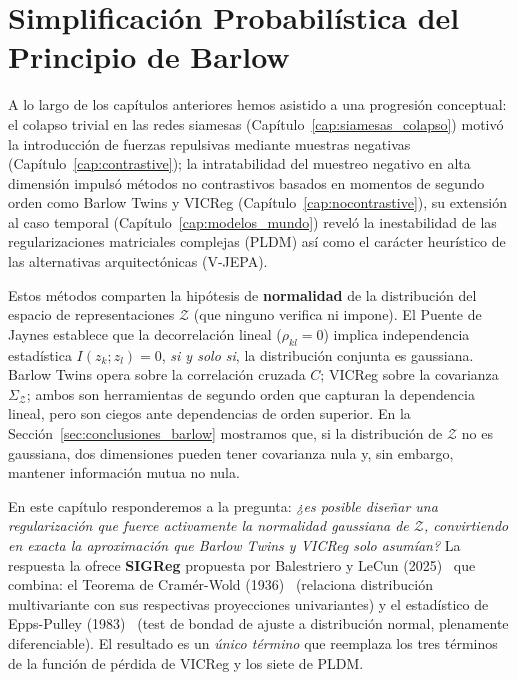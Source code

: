 \chapter{Simplificación Probabilística del Principio de Barlow}
\label{cap:leworldmodel}

A lo largo de los capítulos anteriores hemos asistido a una progresión conceptual: el colapso trivial en las redes siamesas (Capítulo~\ref{cap:siamesas_colapso}) motivó la introducción de fuerzas repulsivas mediante muestras negativas (Capítulo~\ref{cap:contrastive}); la intratabilidad del muestreo negativo en alta dimensión impulsó métodos no contrastivos basados en momentos de segundo orden como Barlow Twins y VICReg (Capítulo~\ref{cap:nocontrastive}), su extensión al caso temporal (Capítulo~\ref{cap:modelos_mundo}) reveló la inestabilidad de las regularizaciones matriciales complejas (PLDM) así como el carácter heurístico de las alternativas arquitectónicas (V-JEPA).

Estos métodos comparten la hipótesis de \textbf{normalidad} de la distribución del espacio de representaciones $\mathcal{Z}$ (que ninguno verifica ni impone). El Puente de Jaynes establece que la decorrelación lineal ($\rho_{kl} = 0$) implica independencia estadística $I(z_k; z_l) = 0$, \emph{si y solo si}, la distribución conjunta es gaussiana. Barlow Twins opera sobre la correlación cruzada $C$; VICReg sobre la covarianza $\Sigma_\mathcal{Z}$; ambos son herramientas de segundo orden que capturan la dependencia lineal, pero son ciegos ante dependencias de orden superior. En la Sección~\ref{sec:conclusiones_barlow} mostramos que, si la distribución de $\mathcal{Z}$ no es gaussiana, dos dimensiones pueden tener covarianza nula y, sin embargo, mantener información mutua no nula.

En este capítulo responderemos a la pregunta: \emph{¿es posible diseñar una regularización que fuerce activamente la normalidad gaussiana de $\mathcal{Z}$, convirtiendo en exacta la aproximación que Barlow Twins y VICReg solo asumían?} La respuesta la ofrece \textbf{SIGReg} propuesta por Balestriero y LeCun (2025)~\cite{balestriero2025lejepa} que combina: el Teorema de Cramér-Wold (1936)~\cite{cramer1936some} (relaciona distribución multivariante con sus respectivas proyecciones univariantes) y el estadístico de Epps-Pulley (1983)~\cite{epps1983test} (test de bondad de ajuste a distribución normal, plenamente diferenciable). El resultado es un \emph{único término} que reemplaza los tres términos de la función de pérdida de VICReg y los siete de PLDM.

